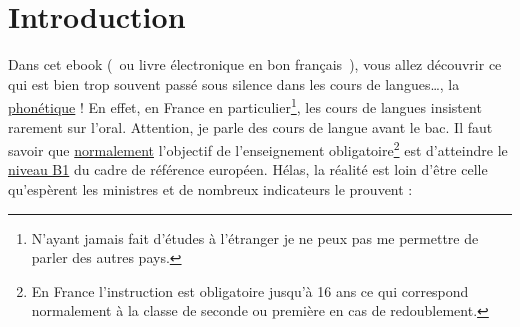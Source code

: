 \chapter{Introduction}\label{chap:intro}
\minitoc

Dans cet ebook (~ou livre électronique en bon français~), vous allez
découvrir ce qui est bien trop souvent passé sous silence dans les
cours de langues\ldots{}, la \underline{phonétique} ! En effet, en France en
particulier\footnote{N'ayant jamais fait d'études à l'étranger je ne
  peux pas me permettre de parler des autres pays.}, les cours de
langues insistent rarement sur l'oral. Attention, je parle des cours
de langue avant le bac. Il faut savoir que \underline{normalement}
l'objectif de l'enseignement obligatoire\footnote{En France
  l'instruction est obligatoire jusqu'à 16 ans ce qui correspond
  normalement à la classe de seconde ou première en cas de
  redoublement.} est d'atteindre le
\href{http://www.cambridgeenglish.org/fr/exams-and-tests/cambridge-english-certificate-cec/}{niveau
  B1} du cadre de référence européen. Hélas, la réalité est
loin d'être celle qu'espèrent les ministres et de nombreux indicateurs le prouvent :
